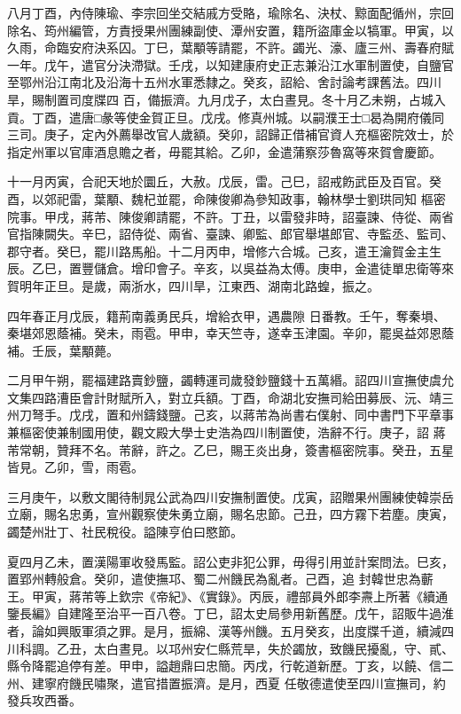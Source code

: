 \begin{pinyinscope}
 八月丁酉，內侍陳瑜、李宗回坐交結戚方受賂，瑜除名、決杖、黥面配循州，宗回除名、筠州編管，方責授果州團練副使、潭州安置，籍所盜庫金以犒軍。甲寅，以久雨，命臨安府決系囚。丁巳，葉顒等請罷，不許。蠲光、濠、廬三州、壽春府賦一年。戊午，遣官分決滯獄。壬戌，以知建康府史正志兼沿江水軍制置使，自鹽官至鄂州沿江南北及沿海十五州水軍悉隸之。癸亥，詔給、舍討論考課舊法。四川旱，賜制置司度牒四
 百，備振濟。九月戊子，太白晝見。冬十月乙未朔，占城入貢。丁酉，遣唐□彖等使金賀正旦。戊戌。修真州城。以嗣濮王士□曷為開府儀同三司。庚子，定內外薦舉改官人歲額。癸卯，詔歸正借補官資人充樞密院效士，於指定州軍以官庫酒息贍之者，毋罷其給。乙卯，金遣蒲察莎魯窩等來賀會慶節。



 十一月丙寅，合祀天地於圜丘，大赦。戊辰，雷。己巳，詔戒飭武臣及百官。癸酉，以郊祀雷，葉顒、魏杞並罷，命陳俊卿為參知政事，翰林學士劉珙同知
 樞密院事。甲戌，蔣芾、陳俊卿請罷，不許。丁丑，以雷發非時，詔臺諫、侍從、兩省官指陳闕失。辛巳，詔侍從、兩省、臺諫、卿監、郎官舉堪郎官、寺監丞、監司、郡守者。癸巳，罷川路馬船。十二月丙申，增修六合城。己亥，遣王瀹賀金主生辰。乙巳，置豐儲倉。增印會子。辛亥，以吳益為太傅。庚申，金遣徒單忠衛等來賀明年正旦。是歲，兩浙水，四川旱，江東西、湖南北路蝗，振之。



 四年春正月戊辰，籍荊南義勇民兵，增給衣甲，遇農隙
 日番教。壬午，奪秦塤、秦堪郊恩蔭補。癸未，雨雹。甲申，幸天竺寺，遂幸玉津園。辛卯，罷吳益郊恩蔭補。壬辰，葉顒薨。



 二月甲午朔，罷福建路賣鈔鹽，蠲轉運司歲發鈔鹽錢十五萬緡。詔四川宣撫使虞允文集四路漕臣會計財賦所入，對立兵額。丁酉，命湖北安撫司給田募辰、沅、靖三州刀弩手。戊戌，置和州鑄錢鹽。己亥，以蔣芾為尚書右僕射、同中書門下平章事兼樞密使兼制國用使，觀文殿大學士史浩為四川制置使，浩辭不行。庚子，詔
 蔣芾常朝，贊拜不名。芾辭，許之。乙巳，賜王炎出身，簽書樞密院事。癸丑，五星皆見。乙卯，雪，雨雹。



 三月庚午，以敷文閣待制晁公武為四川安撫制置使。戊寅，詔贈果州團練使韓崇岳立廟，賜名忠勇，宣州觀察使朱勇立廟，賜名忠節。己丑，四方霧下若塵。庚寅，蠲楚州壯丁、社民稅役。謚陳亨伯曰愍節。



 夏四月乙未，置漢陽軍收發馬監。詔公吏非犯公罪，毋得引用並計案問法。巳亥，置郢州轉般倉。癸卯，遣使撫邛、蜀二州饑民為亂者。己酉，追
 封韓世忠為蘄王。甲寅，蔣芾等上欽宗《帝紀》、《實錄》。丙辰，禮部員外郎李燾上所著《續通鑒長編》自建隆至治平一百八卷。丁巳，詔太史局參用新舊歷。戊午，詔販牛過淮者，論如興販軍須之罪。是月，振綿、漢等州饑。五月癸亥，出度牒千道，續減四川科調。乙丑，太白晝見。以邛州安仁縣荒旱，失於蠲放，致饑民擾亂，守、貳、縣令降罷追停有差。甲申，謚趙鼎曰忠簡。丙戌，行乾道新歷。丁亥，以饒、信二州、建寧府饑民嘯聚，遣官措置振濟。是月，西夏
 任敬德遣使至四川宣撫司，約發兵攻西番。




\end{pinyinscope}
